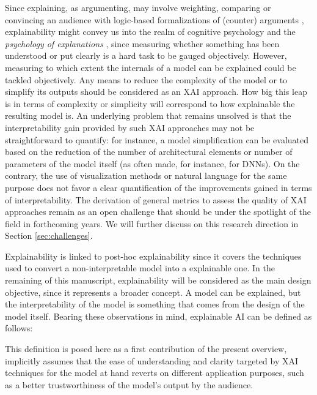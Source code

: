 \documentclass[final]{elsarticle}
\begin{document}
Since explaining, as argumenting, may involve weighting, comparing or convincing an audience with logic-based formalizations of (counter) arguments \cite{Besnard08}, explainability might convey us into the realm of cognitive psychology and the \textit{psychology of explanations} \cite{gunning2017explainable}, since measuring whether something has been understood or put clearly is a hard task to be gauged objectively. However, measuring to which extent the internals of a model can be explained could be tackled objectively. Any means to reduce the complexity of the model or to simplify its outputs should be considered as an XAI approach. How big this leap is in terms of complexity or simplicity will correspond to how explainable the resulting model is. An underlying problem that remains unsolved is that the interpretability gain provided by such XAI approaches may not be straightforward to quantify: for instance, a model simplification can be evaluated based on the reduction of the number of architectural elements or number of parameters of the model itself (as often made, for instance, for DNNs). On the contrary, the use of visualization methods or natural language for the same purpose does not favor a clear quantification of the improvements gained in terms of interpretability. The derivation of general metrics to assess the quality of XAI approaches remain as an open challenge that should be under the spotlight of the field in forthcoming years. We will further discuss on this research direction in Section \ref{sec:challenges}.

Explainability is linked to post-hoc explainability since it covers the techniques used to convert a non-interpretable model into a explainable one. In the remaining of this manuscript, explainability will be considered as the main design objective, since it represents a broader concept. A model can be explained, but the interpretability of the model is something that comes from the design of the model itself. Bearing these observations in mind, explainable AI can be defined as follows: 
\begin{center}
	\noindent{}
\end{center}

This definition is posed here as a first contribution of the present overview, implicitly assumes that the ease of understanding and clarity targeted by XAI techniques for the model at hand reverts on different application purposes, such as a better trustworthiness of the model's output by the audience.
\end{document}
